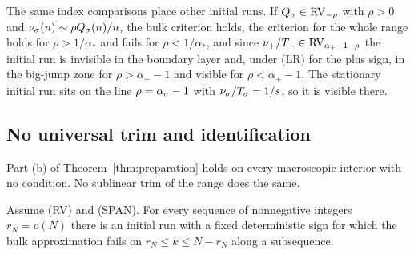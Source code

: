 The same index comparisons place other initial runs. If
$Q_\sigma\in\mathrm{RV}_{-\rho}$ with $\rho>0$ and $\nu_\sigma(n)\sim\rho Q_\sigma(n)/n$, the bulk
criterion holds, the criterion for the whole range holds for $\rho>1/\alpha_*$ and
fails for $\rho<1/\alpha_*$, and since $\nu_{+}/T_{+}\in\mathrm{RV}_{\alpha_{+}-1-\rho}$
the initial run is invisible in the boundary layer and, under (LR) for the plus
sign, in the big-jump zone for $\rho>\alpha_\plus-1$ and visible for
$\rho<\alpha_\plus-1$. The stationary initial run sits on the line
$\rho=\alpha_\sigma-1$ with $\nu_\sigma/T_\sigma=1/s$, so it is visible there.

\subsection{No universal trim\ifarxivbuild{} and identification\fi}\label{sec:prep-trim}

Part (b) of Theorem~\ref{thm:preparation} holds on every macroscopic interior with
no condition. No sublinear trim of the range does the same.

\begin{corollary}\label{cor:no-trim}
Assume (RV) and (SPAN). For every sequence of nonnegative integers $r_N=o(N)$
there is an initial run with a fixed deterministic sign for which the bulk
approximation fails on $r_N\le k\le N-r_N$ along a subsequence.
\end{corollary}

